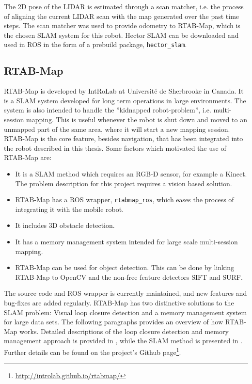The 2D pose of the \ac{LIDAR} is estimated through a scan matcher, i.e. the process of aligning the current \ac{LIDAR} scan with the map generated over the past time steps. The scan matcher was used to provide odometry to \ac{RTAB-Map}, which is the chosen \ac{SLAM} system for this robot. Hector SLAM can be downloaded and used in \ac{ROS} in the form of a prebuild package, \texttt{hector\_slam}.  

\subsection{RTAB-Map}
\label{sec:RTAB-Map}

\ac{RTAB-Map} is developed by IntRoLab at Université de Sherbrooke in Canada. It is a \ac{SLAM} system developed for long term operations in large environments. The system is also intended to handle the ''kidnapped robot-problem'', i.e. multi-session mapping. This is useful whenever the robot is shut down and moved to an unmapped part of the same area, where it will start a new mapping session. \ac{RTAB-Map} is the core feature, besides navigation, that has been integrated into the robot described in this thesis. Some factors which motivated the use of \ac{RTAB-Map} are:

\begin{itemize}
	\item It is a \ac{SLAM} method which requires an RGB-D sensor, for example a Kinect. The problem description for this project requires a vision based solution.
	\item \ac{RTAB-Map} has a \ac{ROS} wrapper, \texttt{rtabmap\_ros}, which eases the process of integrating it with the mobile robot.
	\item It includes 3D obstacle detection.
	\item It has a memory management system intended for large scale multi-session mapping.
	\item \ac{RTAB-Map} can be used for object detection. This can be done by linking \ac{RTAB-Map} to OpenCV and the non-free feature detectors \ac{SIFT} and \ac{SURF}.
\end{itemize}

The source code and \ac{ROS} wrapper is currently maintained, and new features and bug-fixes are added regularly. \ac{RTAB-Map} has two distinctive solutions to the \ac{SLAM} problem: Visual loop closure detection and a memory management system for large data sets. The following paragraphs provides an overview of how \ac{RTAB-Map} works. Detailed descriptions of the loop closure detection and memory management approach is provided in  \cite{labbe13appearance}, while the \ac{SLAM} method is presented in \cite{labbe14online}. Further details can be found on the project's Github page\footnote{\url{http://introlab.github.io/rtabmap/}}.

